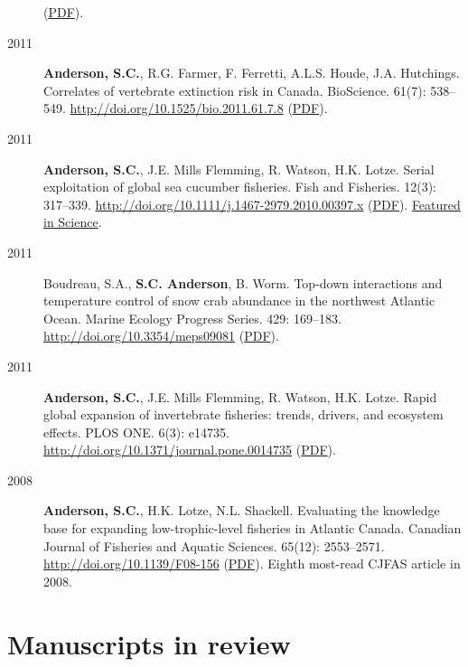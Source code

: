 \begin{description}
(\href{http://icesjms.oxfordjournals.org/cgi/reprint/fss105?ijkey=pFRzMGEDycomI3X\&keytype=ref}{PDF}).
\item[2011]
\textbf{Anderson, S.C.}, R.G. Farmer, F. Ferretti, A.L.S. Houde, J.A.
Hutchings. Correlates of vertebrate extinction risk in Canada.
BioScience. 61(7): 538--549.
\url{http://doi.org/10.1525/bio.2011.61.7.8}
(\href{https://dl.dropboxusercontent.com/u/254940/papers/Anderson_etal_2011_BioScience_with_supplement.pdf}{PDF}).
\item[2011]
\textbf{Anderson, S.C.}, J.E. Mills Flemming, R. Watson, H.K. Lotze.
Serial exploitation of global sea cucumber fisheries. Fish and
Fisheries. 12(3): 317--339.
\url{http://doi.org/10.1111/j.1467-2979.2010.00397.x}
(\href{https://dl.dropboxusercontent.com/u/254940/papers/Anderson_etal_2011_seacucumbers_with_supplement.pdf}{PDF}).
\href{http://www.sciencemag.org/content/331/6014/129.1.full}{Featured in
Science}.
\item[2011]
Boudreau, S.A., \textbf{S.C. Anderson}, B. Worm. Top-down interactions
and temperature control of snow crab abundance in the northwest Atlantic
Ocean. Marine Ecology Progress Series. 429: 169--183.
\url{http://doi.org/10.3354/meps09081}
(\href{http://www.int-res.com/articles/meps_oa/m429p169.pdf}{PDF}).
\item[2011]
\textbf{Anderson, S.C.}, J.E. Mills Flemming, R. Watson, H.K. Lotze.
Rapid global expansion of invertebrate fisheries: trends, drivers, and
ecosystem effects. PLOS ONE. 6(3): e14735.
\url{http://doi.org/10.1371/journal.pone.0014735}
(\href{http://www.plosone.org/article/fetchObject.action?uri=info\%3Adoi\%2F10.1371\%2Fjournal.pone.0014735\&representation=PDF}{PDF}).
\item[2008]
\textbf{Anderson, S.C.}, H.K. Lotze, N.L. Shackell. Evaluating the
knowledge base for expanding low-trophic-level fisheries in Atlantic
Canada. Canadian Journal of Fisheries and Aquatic Sciences. 65(12):
2553--2571. \url{http://doi.org/10.1139/F08-156}
(\href{https://dl.dropboxusercontent.com/u/254940/papers/Anderson_etal_2008_knowledge.pdf}{PDF}).
Eighth most-read CJFAS article in 2008.
\end{description}

\section{Manuscripts in review}\label{manuscripts-in-review}

